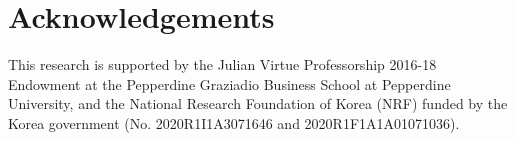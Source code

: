 \section{Acknowledgements}
This research is supported by the Julian Virtue Professorship 2016-18 Endowment at the Pepperdine Graziadio Business School at Pepperdine University, and
the National Research Foundation of Korea (NRF) funded by the Korea government (No. 2020R1I1A3071646 and 2020R1F1A1A01071036).



\address{Dongshin Kim\\
  Pepperdine Graziadio Business School\\
  Pepperdine University\\
  United States of America\\
  }

\address{Sangin Lee\\
  Department of Information and Statistics\\
  Chungnam National University\\
  Korea\\
  }

\address{Sunghoon Kwon\\
  Department of Applied Statistics\\
  Konkuk University\\
  Korea\\
  }
